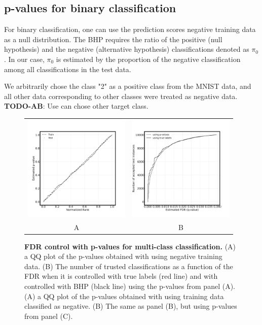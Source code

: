 \documentclass{article}
\newcommand{\todo}[2]{{\color{red} {\bf TODO-#1}: #2}}
\begin{document}
\subsection{p-values for binary classification}

For binary classification, one can use the prediction scores negative training data as a null distribution. The BHP requires the ratio of the positive (null hypothesis) and the negative (alternative hypothesis) classifications denoted as $\pi_0$. In our case, $\pi_0$ is estimated by the proportion of the negative classification among all classifications in the test data.  

We arbitrarily chose the class "2" as a positive class from the MNIST data, and all other data corresponding to other classes were treated as negative data. \todo{AB}{Use can chose other target class}.
  


\begin{figure}
    \centering
	\begin{tabular}{cc}
		\includegraphics[width=2in]{img/cnn_QQ_multi.png} &
		\includegraphics[width=2in]{img/cnn_test_pred_multi.png} \\	
		A & B \\
	\end{tabular}
	\caption{{\bf FDR control with p-values for multi-class classification.}
		(A) a QQ plot of the p-values obtained with using negative training data. (B) The number of trusted classifications as a function of the FDR when it is controlled with true labels (red line) and with controlled with BHP (black line) using the p-values from panel (A).
		(A) a QQ plot of the p-values obtained with using training data classified as negative. (B) The same as panel (B), but using p-values from panel (C).
	}
	\label{fig:examples}
\end{figure}
\end{document}
